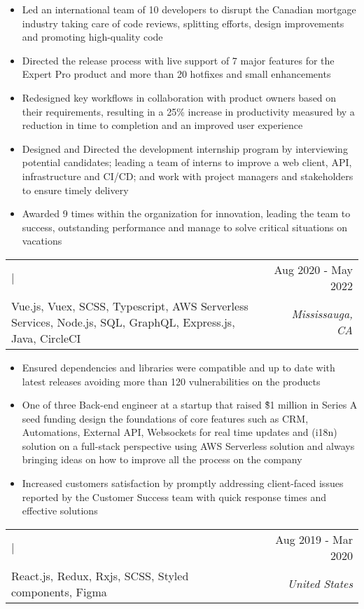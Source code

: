\documentclass[letterpaper,10.8pt]{article}
\makeatletter
\newcommand{\normalFont}[1]{\fontsize{9.5pt}{11pt}{\selectfont{#1}}}
\newcommand{\largeFont}[1]{\fontsize{11pt}{11pt}{\selectfont{#1}}}
\newcommand{\resumeItem}[2]{
  \item{
      { #2 \vspace{-3.4pt}}
    }
  }
\newcommand{\resumeSubheading}[5]{
    \begin{tabular*}{1\textwidth}{l@{\extracolsep{\fill}}r}
      \largeFont{\color{mypink1}\textbf{#1}} | \normalFont{#3} & \small{#4} \\
      {\normalFont{Stack: } #5} & \textit{\small #2} \\
    \end{tabular*}\vspace{-8pt}
  }
\newcommand{\resumeItemListStart}{\begin{itemize}}
\newcommand{\resumeItemListEnd}{\end{itemize}\vspace{4pt}}
\makeatother
\begin{document}
\resumeItemListStart
\resumeItem{Technical Desicion Architect}
{Led an international team of 10 developers to disrupt the Canadian mortgage industry taking care of code reviews, splitting efforts, design improvements and promoting high-quality code}
\resumeItem{Release Process Coordinator}
{Directed the release process with live support of 7 major features for the Expert Pro product and more than 20 hotfixes and small enhancements}
\resumeItem{Core Feature Designer}{Redesigned key workflows in collaboration with product owners based on their requirements, resulting in a 25\% increase in productivity measured by a reduction in time to completion and an improved user experience}
\resumeItem{Development Internship Program Director}{Designed and Directed the development internship program by interviewing potential candidates; leading a team of interns to improve a web client, API, infrastructure and CI/CD; and work with project managers and stakeholders to ensure timely delivery}
\resumeItem{Recognized for Outstanding Performance}{Awarded 9 times within the organization for innovation, leading the team to success, outstanding performance and manage to solve critical situations on vacations}
\resumeItemListEnd

\resumeSubheading
{Founding Software Engineer}{Mississauga, CA}
{Doorr (acquired by Finastra)}{Aug 2020 -  May 2022}
{Vue.js, Vuex, SCSS, Typescript, AWS Serverless Services, Node.js, SQL, GraphQL, Express.js, Java, CircleCI}

\resumeItemListStart
\resumeItem{Library Compatibility Manager}
{Ensured dependencies and libraries were compatible and up to date with latest releases avoiding more than 120 vulnerabilities on the products}
\resumeItem{Startup Contributor}
{One of three Back-end engineer at a startup that raised \~\$1 million in Series A seed funding design the foundations of core features such as CRM, Automations, External API, Websockets for real time updates and (i18n) solution on a full-stack perspective using AWS Serverless solution and always bringing ideas on how to improve all the process on the company}
\resumeItem{Production Code Fixer}
{Increased customers satisfaction by promptly addressing client-faced issues reported by the Customer Success team with quick response times and effective solutions}
\resumeItemListEnd

\resumeSubheading
{Frontend Developer}{United States}
{Telesero}{Aug 2019 - Mar 2020}
{React.js, Redux, Rxjs, SCSS, Styled components, Figma}
\end{document}
